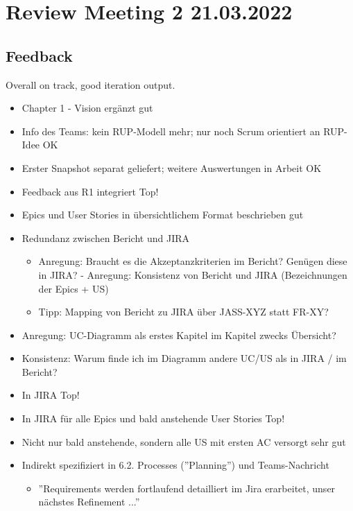 \section{Review Meeting 2 21.03.2022}

\subsection{Feedback}
Overall on track, good iteration output.

\begin{itemize}
    \item Chapter 1 - Vision ergänzt \textrightarrow gut
    \item Info des Teams: kein RUP-Modell mehr; nur noch Scrum orientiert an RUP-Idee \textrightarrow OK
    \item Erster Snapshot separat geliefert; weitere Auswertungen in Arbeit \textrightarrow OK
    \item Feedback aus R1 integriert \textrightarrow Top!
    \item Epics und User Stories in übersichtlichem Format beschrieben \textrightarrow gut
    \item Redundanz zwischen Bericht und JIRA
    \begin{itemize}
        \item Anregung: Braucht es die Akzeptanzkriterien im Bericht? Genügen diese in JIRA? - Anregung: Konsistenz von Bericht und JIRA (Bezeichnungen der Epics + US)
        \item Tipp: Mapping von Bericht zu JIRA über JASS-XYZ statt FR-XY?
    \end{itemize}
    \item Anregung: UC-Diagramm als erstes Kapitel im Kapitel zwecks Übersicht?
    \item Konsistenz: Warum finde ich im Diagramm andere UC/US als in JIRA / im Bericht?
    \item In JIRA \textrightarrow Top!
    \item In JIRA für alle Epics und bald anstehende User Stories \textrightarrow Top!
    \item Nicht nur bald anstehende, sondern alle US mit ersten AC versorgt \textrightarrow sehr gut
    \item Indirekt spezifiziert in 6.2. Processes (''Planning'') und Teams-Nachricht
    \begin{itemize}
        \item ''Requirements werden fortlaufend detailliert im Jira erarbeitet, unser nächstes Refinement ...''

\end{itemize}
\end{itemize}
